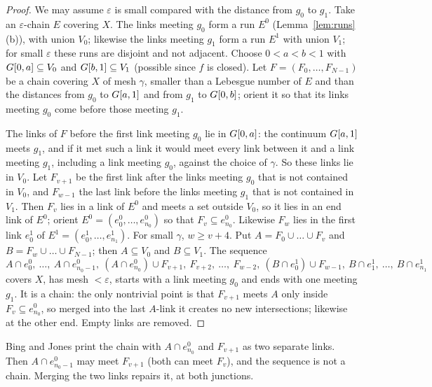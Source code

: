 \begin{proof}
We may assume $\varepsilon$ is small compared with the distance from $g_0$ to $g_1$. Take an $\varepsilon$-chain $E$ covering $X$. The links meeting $g_0$ form a run $E^0$ (Lemma~\ref{lem:runs}(b)), with union $V_0$; likewise the links meeting
$g_1$ form a run $E^1$ with union $V_1$; for small $\varepsilon$ these runs are disjoint and not adjacent. Choose $0<a<b<1$ with $G[0,a]\subseteq V_0$ and $G[b,1]\subseteq V_1$ (possible since $f$ is closed). Let $F=(F_0,\dots,F_{N-1})$ be a chain covering $X$ of mesh $\gamma$, smaller than a Lebesgue number of $E$ and
than the distances from $g_0$ to $G[a,1]$ and from $g_1$ to $G[0,b]$; orient it so that its links meeting $g_0$ come before those meeting $g_1$.

The links of $F$ before the first link meeting $g_0$ lie in $G[0,a]$: the continuum $G[a,1]$ meets $g_1$, and if it met such a link it would meet every link
between it and a link meeting $g_1$, including a link meeting $g_0$, against the choice of $\gamma$. So these links lie in $V_0$. Let $F_{v+1}$ be the first link
after the links meeting $g_0$ that is not contained in $V_0$, and $F_{w-1}$ the last link before the links meeting $g_1$ that is not contained in $V_1$. Then
$F_v$ lies in a link of $E^0$ and meets a set outside $V_0$, so it lies in an end link of $E^0$; orient $E^0=(e^0_0,\dots,e^0_{n_0})$ so that $F_v\subseteq
e^0_{n_0}$. Likewise $F_w$ lies in the first link $e^1_0$ of $E^1=(e^1_0,\dots,e^1_{n_1})$. For small $\gamma$, $w\ge v+4$. Put $A=F_0\cup\dots\cup F_v$ and
$B=F_w\cup\dots\cup F_{N-1}$; then $A\subseteq V_0$ and $B\subseteq V_1$. The sequence
\[
A\cap e^0_0,\ \dots,\ A\cap e^0_{n_0-1},\ (A\cap e^0_{n_0})\cup F_{v+1},\ F_{v+2},\ \dots,\ F_{w-2},\ (B\cap e^1_0)\cup F_{w-1},\ B\cap e^1_1,\ \dots,\ B\cap
e^1_{n_1}
\]
covers $X$, has mesh $<\varepsilon$, starts with a link meeting $g_0$ and ends with one meeting $g_1$. It is a chain: the only nontrivial point is that
$F_{v+1}$ meets $A$ only inside $F_v\subseteq e^0_{n_0}$, so merged into the last $A$-link it creates no new intersections; likewise at the other end. Empty links
are removed.
\end{proof}


\begin{remark}
Bing and Jones print the chain with $A\cap e^0_{n_0}$ and $F_{v+1}$ as two separate links. Then $A\cap e^0_{n_0-1}$ may meet $F_{v+1}$ (both can meet $F_v$), and
the sequence is not a chain. Merging the two links repairs it, at both junctions.
\end{remark}

